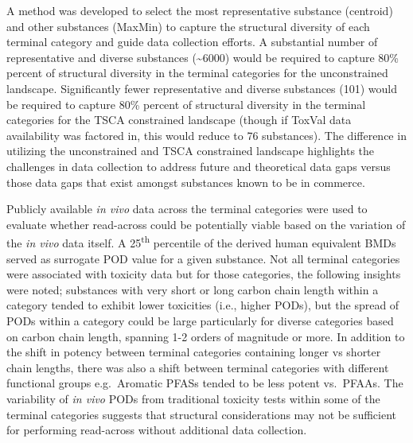 \documentclass[
  super,
  preprint,
  3p]{elsarticle}
\begin{document}
A method was developed to select the most representative substance
(centroid) and other substances (MaxMin) to capture the structural
diversity of each terminal category and guide data collection efforts. A
substantial number of representative and diverse substances
(\textasciitilde6000) would be required to capture 80\% percent of
structural diversity in the terminal categories for the unconstrained
landscape. Significantly fewer representative and diverse substances
(101) would be required to capture 80\% percent of structural diversity
in the terminal categories for the TSCA constrained landscape (though if
ToxVal data availability was factored in, this would reduce to 76
substances). The difference in utilizing the unconstrained and TSCA
constrained landscape highlights the challenges in data collection to
address future and theoretical data gaps versus those data gaps that
exist amongst substances known to be in commerce.

Publicly available \emph{in vivo} data across the terminal categories
were used to evaluate whether read-across could be potentially viable
based on the variation of the \emph{in vivo} data itself. A
25\textsuperscript{th} percentile of the derived human equivalent BMDs
served as surrogate POD value for a given substance. Not all terminal
categories were associated with toxicity data but for those categories,
the following insights were noted; substances with very short or long
carbon chain length within a category tended to exhibit lower toxicities
(i.e., higher PODs), but the spread of PODs within a category could be
large particularly for diverse categories based on carbon chain length,
spanning 1-2 orders of magnitude or more. In addition to the shift in
potency between terminal categories containing longer vs shorter chain
lengths, there was also a shift between terminal categories with
different functional groups e.g.~Aromatic PFASs tended to be less potent
vs.~PFAAs. The variability of \emph{in vivo} PODs from traditional
toxicity tests within some of the terminal categories suggests that
structural considerations may not be sufficient for performing
read-across without additional data collection.
\end{document}
